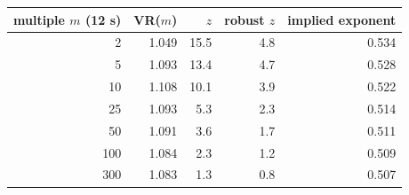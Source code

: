 \begin{tabular}{|r|r|r|r|r|}
\hline
\rowcolor{gray!15}multiple $m$ (12 s) & VR($m$) & $z$ & robust $z$ & implied exponent \\
\hline
2 & 1.049 & 15.5 & 4.8 & 0.534 \\
\hline
5 & 1.093 & 13.4 & 4.7 & 0.528 \\
\hline
10 & 1.108 & 10.1 & 3.9 & 0.522 \\
\hline
25 & 1.093 & 5.3 & 2.3 & 0.514 \\
\hline
50 & 1.091 & 3.6 & 1.7 & 0.511 \\
\hline
100 & 1.084 & 2.3 & 1.2 & 0.509 \\
\hline
300 & 1.083 & 1.3 & 0.8 & 0.507 \\
\hline
\end{tabular}
